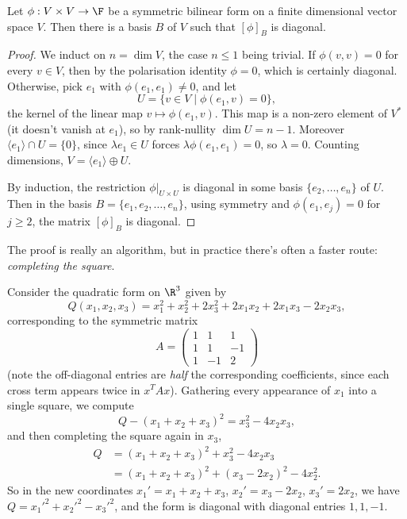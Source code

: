 \begin{theorem}
    Let $\phi: V \times V \rightarrow \F$ be a symmetric bilinear form on a finite dimensional vector space $V$. Then there is a basis $B$ of $V$ such that $[\phi]_B$ is diagonal.
\end{theorem}
\begin{proof}
    We induct on $n = \dim V$, the case $n \leq 1$ being trivial. If $\phi(v, v) = 0$ for every $v \in V$, then by the polarisation identity $\phi = 0$, which is certainly diagonal. Otherwise, pick $e_1$ with $\phi(e_1, e_1) \neq 0$, and let
    $$
    U = \{v \in V \mid \phi(e_1, v) = 0\},
    $$
    the kernel of the linear map $v \mapsto \phi(e_1, v)$. This map is a non-zero element of $V^*$ (it doesn't vanish at $e_1$), so by rank-nullity $\dim U = n - 1$. Moreover $\langle e_1 \rangle \cap U = \{0\}$, since $\lambda e_1 \in U$ forces $\lambda \phi(e_1, e_1) = 0$, so $\lambda = 0$. Counting dimensions, $V = \langle e_1 \rangle \oplus U$.

    By induction, the restriction $\phi|_{U \times U}$ is diagonal in some basis $\{e_2, \dots, e_n\}$ of $U$. Then in the basis $B = \{e_1, e_2, \dots, e_n\}$, using symmetry and $\phi(e_1, e_j) = 0$ for $j \geq 2$, the matrix $[\phi]_B$ is diagonal.
\end{proof}

The proof is really an algorithm, but in practice there's often a faster route: \emph{completing the square}.

\begin{example}
    Consider the quadratic form on $\R^3$ given by
    $$
    Q(x_1, x_2, x_3) = x_1^2 + x_2^2 + 2x_3^2 + 2x_1x_2 + 2x_1 x_3 - 2x_2x_3,
    $$
    corresponding to the symmetric matrix
    $$
    A = \begin{pmatrix}
        1 & 1 & 1 \\
        1 & 1 & -1 \\
        1 & -1 & 2
    \end{pmatrix}
    $$
    (note the off-diagonal entries are \emph{half} the corresponding coefficients, since each cross term appears twice in $x^TAx$). Gathering every appearance of $x_1$ into a single square, we compute
    $$
    Q - (x_1 + x_2 + x_3)^2 = x_3^2 - 4x_2 x_3,
    $$
    and then completing the square again in $x_3$,
    \begin{align*}
        Q &= (x_1 + x_2 + x_3)^2 + x_3^2 - 4x_2x_3 \\
        &= (x_1 + x_2 + x_3)^2 + (x_3 - 2x_2)^2 - 4x_2^2.
    \end{align*}
    So in the new coordinates $x_1' = x_1 + x_2 + x_3$, $x_2' = x_3 - 2x_2$, $x_3' = 2x_2$, we have $Q = x_1'^2 + x_2'^2 - x_3'^2$, and the form is diagonal with diagonal entries $1, 1, -1$.
\end{example}

